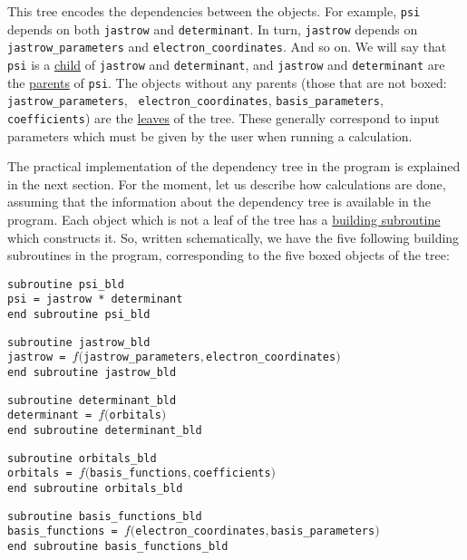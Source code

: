 \documentclass[a4paper,11pt]{article}
\newcommand\Def[1]{\underline{#1}}
\begin{document}
This tree encodes the dependencies between the objects. For example, {\tt psi} depends on both {\tt jastrow} and {\tt determinant}. In turn, {\tt jastrow} depends on {\tt jastrow_parameters} and {\tt electron_coordinates}. And so on. We will say that {\tt psi} is a \Def{child} of {\tt jastrow} and {\tt determinant}, and {\tt jastrow} and {\tt determinant} are the \Def{parents} of  {\tt psi}. The objects without any parents (those that are not boxed: {\tt jastrow_parameters}, {\tt
electron_coordinates}, {\tt basis_parameters}, {\tt coefficients}) are the \Def{leaves} of the tree. These generally correspond to input parameters which must be given by the user when running a calculation.

\vspace{1em}
The practical implementation of the dependency tree in the program is explained in the next section. For the moment, let us describe how calculations are done, assuming that the information about the dependency tree is available in the program.
Each object which is not a leaf of the tree has a \Def{building subroutine} which constructs it. So, written schematically, we have the five following building subroutines in the program, corresponding to the five boxed objects of the tree:

\vspace{0.5cm}
\noindent
{\tt subroutine psi_bld\\
psi = jastrow * determinant\\
end subroutine psi_bld}

\vspace{0.5cm}
\noindent
{\tt subroutine jastrow_bld\\
jastrow  = $f(${\tt jastrow_parameters}$,${\tt electron_coordinates}$)$\\
end subroutine jastrow_bld}

\vspace{0.5cm}
\noindent
{\tt subroutine determinant_bld\\
determinant  = $f(${\tt orbitals}$)$\\
end subroutine determinant_bld}

\vspace{0.5cm}
\noindent
{\tt subroutine orbitals_bld\\
orbitals  = $f(${\tt basis_functions}$,${\tt coefficients}$)$\\
end subroutine orbitals_bld}

\vspace{0.5cm}
\noindent
{\tt subroutine basis_functions_bld\\
basis_functions  = $f(${\tt electron_coordinates}$,${\tt basis_parameters}$)$\\
end subroutine basis_functions_bld}
\end{document}

